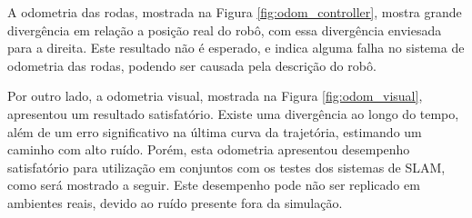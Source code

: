\documentclass[repeatfields,xlists,xpacks,oneside,yearsonly]{ufrgscca}
\begin{document}
A odometria das rodas, mostrada na Figura \ref{fig:odom_controller},
mostra grande divergência em relação a posição real do robô, com essa
divergência enviesada para a direita.
Este resultado não é esperado, e indica alguma falha no sistema de odometria
das rodas, podendo ser causada pela descrição do robô.

Por outro lado, a odometria visual, mostrada na Figura \ref{fig:odom_visual},
apresentou um resultado satisfatório. Existe uma divergência ao longo do tempo,
além de um erro significativo na última curva da trajetória, estimando um caminho
com alto ruído.
Porém, esta odometria apresentou desempenho satisfatório para utilização
em conjuntos com os testes dos sistemas de SLAM, como será mostrado a seguir.
Este desempenho pode não ser replicado em ambientes reais, devido
ao ruído presente fora da simulação.
\end{document}
